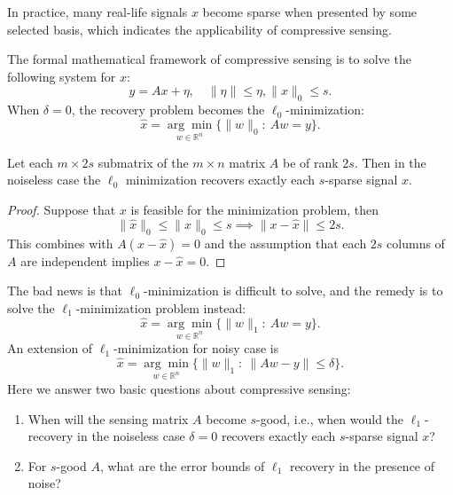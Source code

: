 In practice, many real-life signals $x$ become sparse when presented by some selected basis, which indicates the applicability of compressive sensing.

The formal mathematical framework of compressive sensing is to solve the following system for $x$:
\[
y=Ax+\eta,\quad \|\eta\|\le\eta,
\|x\|_0\le s.
\]
When $\delta=0$, the recovery problem becomes the $\ell_0$-minimization:
\[
\hat{x}=\underset{w\in\mathbb{R}^n}{\arg\min}\bigg\{
\|w\|_0:~Aw=y
\bigg\}.
\]
\begin{proposition}
Let each $m\times 2s$ submatrix of the $m\times n$ matrix $A$ be of rank $2s$.
Then in the noiseless case the $\ell_0$ minimization recovers exactly each $s$-sparse signal $x$.
\end{proposition}
\begin{proof}
Suppose that $x$ is feasible for the minimization problem, then
\[
\|\hat{x}\|_0\le \|x\|_0\le s\implies \|x - \hat{x}\|\le 2s.
\]
This combines with $A(x-\hat{x})=0$ and the assumption that each $2s$ columns of $A$ are independent implies $x-\hat{x}=0$.
\end{proof}
The bad news is that $\ell_0$-minimization is difficult to solve, and the remedy is to solve the $\ell_1$-minimization problem instead:
\[
\hat{x}=\underset{w\in\mathbb{R}^n}{\arg\min}\bigg\{
\|w\|_1:~Aw=y
\bigg\}.
\]
An extension of $\ell_1$-minimization for noisy case is
\[
\hat{x}=\underset{w\in\mathbb{R}^n}{\arg\min}\bigg\{
\|w\|_1:~\|Aw-y\|\le\delta
\bigg\}.
\]
Here we answer two basic questions about compressive sensing:
\begin{enumerate}
\item
When will the sensing matrix $A$ become $s$-good, i.e., when would the $\ell_1$-recovery in the noiseless case $\delta=0$ recovers exactly each $s$-sparse signal $x$?
\item
For $s$-good $A$, what are the error bounds of $\ell_1$ recovery in the presence of noise?
\end{enumerate}


